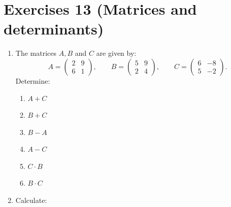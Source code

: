 \documentclass[
  12pt,
  oneside]{book}
\providecommand{\tightlist}{%
  \setlength{\itemsep}{0pt}\setlength{\parskip}{0pt}}
\theoremstyle{definition}
\theoremstyle{definition}
\theoremstyle{definition}
\theoremstyle{definition}
\theoremstyle{remark}
\begin{document}
\hypertarget{exercises-13-matrices-and-determinants}{%
\chapter*{Exercises 13 (Matrices and determinants)}\label{exercises-13-matrices-and-determinants}}

\begin{enumerate}
\def\labelenumi{\arabic{enumi}.}
\item
  The matrices \(A,B\) and \(C\) are given by:
  \[A=\begin{pmatrix}2&9\\6&1\end{pmatrix},\qquad B=\begin{pmatrix}5&9\\2&4\end{pmatrix},\qquad C=\begin{pmatrix}6&-8\\5&-2\end{pmatrix}.\]
  Determine:

  \begin{enumerate}
  \def\labelenumii{\roman{enumii})}
  \tightlist
  \item
    \(A+C\)
  \item
    \(B+C\)
  \item
    \(B-A\)
  \item
    \(A-C\)
  \item
    \(C\cdot B\)
  \item
    \(B\cdot C\)
  \end{enumerate}
\item
  Calculate:


\end{enumerate}
\end{document}

